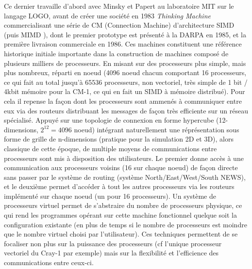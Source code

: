Ce dernier travaille d'abord avec Minsky et Papert au laboratoire MIT sur le langage LOGO, avant de créer une société en 1983 \textit{Thinking Machine} commercialisant une série de CM (Connection Machine) d’architecture SIMD (puis MIMD ), dont le premier prototype est présenté à la DARPA en 1985, et la première livraison commerciale en 1986. Ces machines constituent une référence historique initiale importante dans la construction de machines composé de plusieurs milliers de processeurs. En misant sur des processeurs plus simple, mais plus nombreux, réparti en noeud (4096 noeud chacun comportant 16 processeurs, ce qui fait au total jusqu'à 65536 processeurs, non vectoriel, très simple de 1 bit / 4kbit mémoire pour la CM-1, ce qui en fait un SIMD à mémoire distribué). Pour cela il repense la façon dont les processeurs sont ammenés à communiquer entre eux via des routeurs distribuant les messages de façon très efficiente sur un réseau spécialisé. Appuyé sur une topologie de connexion en forme hypercube (12-dimensions, $2^12 = 4096$ noeud) intégrant naturellement une réprésentation sous forme de grille de n-dimensions (pratique pour la simulation 2D et 3D), alors classique de cette époque, de multiple moyens de communications entre processeurs sont mis à disposition des utilisateurs. Le premier donne accès à une communication aux processeurs voisins (16 sur chaque noeud) de façon directe sans passer par le système de routing (système North/East/West/South NEWS), et le deuxième permet d'accéder à tout les autres processeurs via les routeurs implémenté sur chaque noeud (un pour 16 processeurs). Un système de processeurs virtuel permet de s'abstraire du nombre de processeurs physique, ce qui rend les programmes opérant sur cette machine fonctionnel quelque soit la configuration existante (en plus de temps si le nombre de processeurs est moindre que le nombre virtuel choisi par l'utilisateur). Ces techniques permettent de se focaliser non plus sur la puissance des processeurs (cf l'unique processeur vectoriel du Cray-1 par exemple) mais sur la flexibilité et l'efficience des communications entre ceux-ci.

